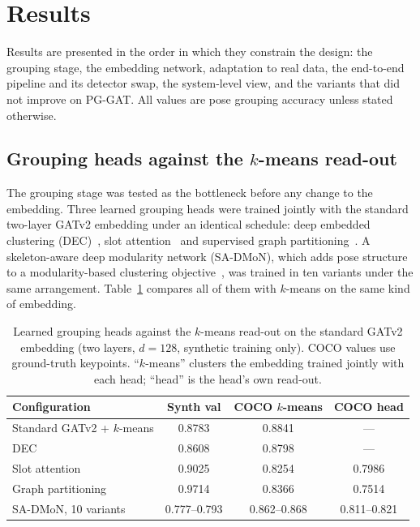 \section{Results}
\label{sec:results}

Results are presented in the order in which they constrain the design: the grouping stage, the embedding network,
adaptation to real data, the end-to-end pipeline and its detector swap, the system-level view,
and the variants that did not improve on PG-GAT.
All values are pose grouping accuracy unless stated otherwise.

\subsection{Grouping heads against the $k$-means read-out}
\label{sec:results_heads}

The grouping stage was tested as the bottleneck before any change to the embedding.
Three learned grouping heads were trained jointly with the standard two-layer GATv2 embedding under an identical schedule:
deep embedded clustering (DEC)~\citep{xie2016dec}, slot attention~\citep{locatello2020slotattention}
and supervised graph partitioning~\citep{yang2020gcnve}.
A skeleton-aware deep modularity network (SA-DMoN),
which adds pose structure to a modularity-based clustering objective~\citep{tsitsulin2023dmon},
was trained in ten variants under the same arrangement.
Table~\ref{tab:heads} compares all of them with $k$-means on the same kind of embedding.

\begin{table}[!t]
\centering
\caption{Learned grouping heads against the $k$-means read-out on the standard GATv2 embedding (two layers, $d=128$, synthetic training only).
COCO values use ground-truth keypoints.
``$k$-means'' clusters the embedding trained jointly with each head; ``head'' is the head's own read-out.}
\label{tab:heads}
\footnotesize\setlength{\tabcolsep}{3.5pt}
\begin{tabular}{lccc}
\toprule
Configuration & Synth val & COCO $k$-means & COCO head \\
\midrule
Standard GATv2 + $k$-means & 0.8783 & 0.8841 & --- \\
DEC & 0.8608 & 0.8798 & --- \\
Slot attention & 0.9025 & 0.8254 & 0.7986 \\
Graph partitioning & 0.9714 & 0.8366 & 0.7514 \\
SA-DMoN, 10 variants & 0.777--0.793 & 0.862--0.868 & 0.811--0.821 \\
\bottomrule
\end{tabular}
\end{table}

